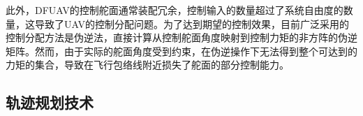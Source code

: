此外，DFUAV的控制舵面通常装配冗余，控制输入的数量超过了系统自由度的数量，这导致了UAV的控制分配问题\cite{naldiPrototypeDuctedFanAerial2014b}。为了达到期望的控制效果，目前广泛采用的控制分配方法是伪逆法\cite{peddlePracticalHoverFlight2009a,pflimlinPositionControlDucted2007b,shengNearHoverAdaptiveAttitude2015b}，直接计算从控制舵面角度映射到控制力矩的非方阵的伪逆矩阵。然而，由于实际的舵面角度受到约束，在伪逆操作下无法得到整个可达到的力矩的集合\cite{durhamAircraftControlAllocation2017a}，导致在飞行包络线附近损失了舵面的部分控制能力\cite{HKXB202010026}。

\subsection{轨迹规划技术}



